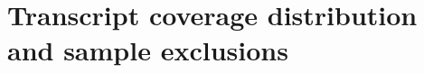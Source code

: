 \documentclass{article}
\begin{document}

%
%	
%	
%

\section{Transcript coverage distribution and sample exclusions}
\end{document}
